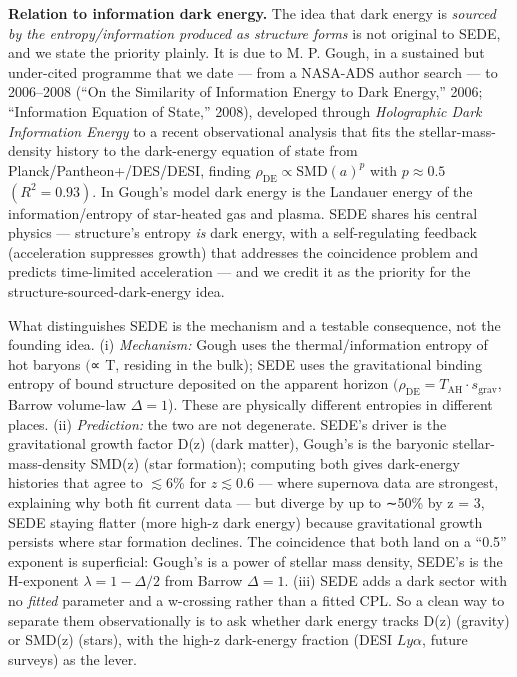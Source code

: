 \documentclass[preprint,12pt]{elsarticle}
\begin{document}
\textbf{Relation to information dark energy.} The idea that dark energy
is \emph{sourced by the entropy/information produced as structure forms}
is not original to SEDE, and we state the priority plainly. It is due to
M. P. Gough, in a sustained but under-cited programme that we date ---
from a NASA-ADS author search --- to 2006--2008 (``On the Similarity of
Information Energy to Dark Energy,'' 2006; ``Information Equation of
State,'' 2008), developed through \emph{Holographic Dark Information
Energy} \citep{Gough:2011eq} to a recent observational analysis
\citep{Gough2025} that fits the stellar-mass-density history to the
dark-energy equation of state from Planck/Pantheon+/DES/DESI, finding
\(\rho _\mathrm{DE} \propto  \mathrm{SMD}(a)^{p}\) with
\(p \approx  0.5\) \((R^{2} = 0.93)\). In Gough's model dark energy is
the Landauer energy of the information/entropy of star-heated gas and
plasma. SEDE shares his central physics --- structure's entropy
\emph{is} dark energy, with a self-regulating feedback (acceleration
suppresses growth) that addresses the coincidence problem and predicts
time-limited acceleration --- and we credit it as the priority for the
structure-sourced-dark-energy idea.

What distinguishes SEDE is the mechanism and a testable consequence, not
the founding idea. (i) \emph{Mechanism:} Gough uses the
thermal/information entropy of hot baryons \((\)∝ T, residing in the
bulk); SEDE uses the gravitational binding entropy of bound structure
deposited on the apparent horizon
\((\rho _\mathrm{DE} = T_\mathrm{AH}\cdot s_{\mathrm{grav}}\), Barrow
volume-law \(\Delta =1\)). These are physically different entropies in
different places. (ii) \emph{Prediction:} the two are not degenerate.
SEDE's driver is the gravitational growth factor D(z) (dark matter),
Gough's is the baryonic stellar-mass-density SMD(z) (star formation);
computing both gives dark-energy histories that agree to
\(\lesssim  6\)\% for \(z \lesssim  0.6\) --- where supernova data are
strongest, explaining why both fit current data --- but diverge by up to
∼50\% by z = 3, SEDE staying flatter (more high-z dark energy) because
gravitational growth persists where star formation declines. The
coincidence that both land on a ``0.5'' exponent is superficial: Gough's
is a power of stellar mass density, SEDE's is the H-exponent
\(\lambda  = 1-\Delta /2\) from Barrow \(\Delta =1\). (iii) SEDE adds a
dark sector with no \emph{fitted} parameter and a w-crossing rather than
a fitted CPL. So a clean way to separate them observationally is to ask
whether dark energy tracks D(z) (gravity) or SMD(z) (stars), with the
high-z dark-energy fraction (DESI \(Ly\alpha\), future surveys) as the
lever.
\end{document}
